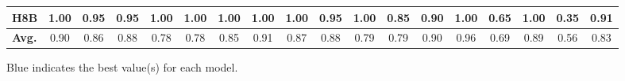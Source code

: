 \begin{table}[t]
\begin{tabular}{l|ccc|ccc|ccc|ccc|cc|cc|c}
\hline
H8B & \cellcolor{blue!15}1.00 & 0.95 & 0.95 & \cellcolor{blue!15}1.00 & \cellcolor{blue!15}1.00 & \cellcolor{blue!15}1.00 & \cellcolor{blue!15}1.00 & \cellcolor{blue!15}1.00 & 0.95 & \cellcolor{blue!15}1.00 & 0.85 & 0.90 & \cellcolor{blue!15}1.00 & 0.65 & \cellcolor{blue!15}1.00 & 0.35 & 0.91 \\
\hline
\textbf{Avg.} & 0.90 & 0.86 & 0.88 & 0.78 & 0.78 & 0.85 & 0.91 & 0.87 & 0.88 & 0.79 & 0.79 & 0.90 & 0.96 & 0.69 & 0.89 & 0.56 & 0.83 \\
\bottomrule
\end{tabular}
\vspace{1mm}
\parbox{\linewidth}{\centering\footnotesize \colorbox{blue!15}{Blue} indicates the best value(s) for each model.}
\end{table}